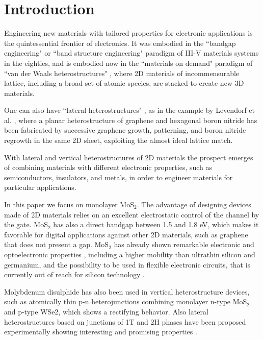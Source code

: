 \documentclass[aps,reprint,superscriptaddress,secnumarabic,amssymb,showpacs]{revtex4-1}
\begin{document}
\maketitle


\section{Introduction}
Engineering new materials with tailored properties for electronic applications is the quintessential frontier of electronics.
It was embodied in the ``bandgap engineering" \cite{Capasso1987} or ``band structure engineering" \cite{Yablonovitch1987} paradigm of III-V materials systems in the eighties, and is embodied now in the ``materials on demand" paradigm \cite{novoselov2012} of ``van der Waals heterostructures" \cite{Geim2013}, where 2D materials of incommensurable lattice, including a broad set of atomic species, are stacked to create new 3D materials.

One can also have ``lateral heterostructures" \cite{Ci2010}, as in the example by Levendorf et al. \cite{Levendorf2012}, where a planar heterostructure of graphene and hexagonal boron nitride has been fabricated by successive graphene growth, patterning, and boron nitride regrowth in the same 2D sheet, exploiting the almost ideal lattice match. 

With lateral and vertical heterostructures of 2D materials the prospect emerges of combining materials with different electronic properties, such as semiconductors, insulators, and metals, in order to 
engineer materials for particular applications.

In this paper we focus on monolayer MoS$_2$. The advantage of designing devices made of 2D materials relies on an excellent electrostatic control of the channel by the gate. MoS$_2$ has also a direct bandgap between 1.5 and 1.8 eV, which makes it favorable for digital applications against other 2D materials, such as graphene that does not present a gap. MoS$_2$ has already shown remarkable electronic and optoelectronic properties \cite{Rad2011}, including a higher mobility than ultrathin silicon and germanium, and the possibility to be used in flexible electronic circuits, that is currently out of reach for silicon technology \cite{Wang2012}.

Molybdenum disulphide has also been used in vertical heterostructure devices, such as atomically thin p-n heterojunctions \cite{Lee2014} combining monolayer n-type MoS$_2$ and p-type WSe2, which shows a rectifying behavior. Also lateral heterostructures based on junctions of 1T and 2H phases have been proposed experimentally showing interesting and promising properties \cite{Eda2012,Kappera2014,Kappera2014_2}.
\end{document}
